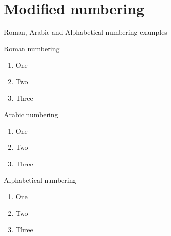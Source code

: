 \documentclass{article}
\begin{document}
\newpage

\section{Modified numbering}
Roman, Arabic and Alphabetical numbering examples
\newline


Roman numbering
\begin{enumerate}[label=(\roman*)]
    \item One
    \item Two
    \item Three
\end{enumerate}

Arabic numbering
\begin{enumerate}[label=(\arabic*)]
    \item One
    \item Two
    \item Three
\end{enumerate}

Alphabetical numbering
\begin{enumerate}[label=(\alph*)]
    \item One
    \item Two
    \item Three
\end{enumerate}
\end{document}
